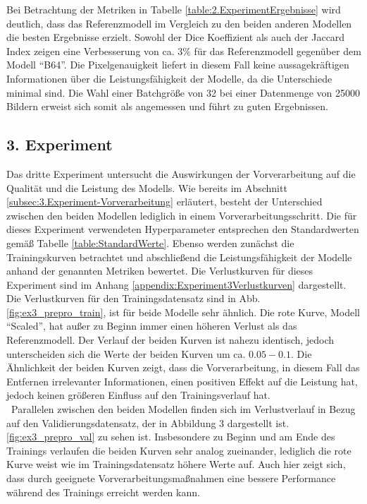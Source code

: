 Bei Betrachtung der Metriken in Tabelle \ref{table:2.ExperimentErgebnisse} wird deutlich, dass das Referenzmodell im Vergleich zu den beiden anderen Modellen die besten Ergebnisse erzielt. Sowohl der Dice Koeffizient als auch der Jaccard Index zeigen eine Verbesserung von ca. $3\%$ für das Referenzmodell gegenüber dem Modell ``B64''. Die Pixelgenauigkeit liefert in diesem Fall keine aussagekräftigen Informationen über die Leistungsfähigkeit der Modelle, da die Unterschiede minimal sind. Die Wahl einer Batchgröße von 32 bei einer Datenmenge von 25000 Bildern erweist sich somit als angemessen und führt zu guten Ergebnissen.

\subsection{3. Experiment}
\label{subsec:3.Experiment}
Das dritte Experiment untersucht die Auswirkungen der Vorverarbeitung auf die Qualität und die Leistung des Modells. Wie bereits im Abschnitt \ref{subsec:3.Experiment-Vorverarbeitung} erläutert, besteht der Unterschied zwischen den beiden Modellen lediglich in einem Vorverarbeitungsschritt. Die für dieses Experiment verwendeten Hyperparameter entsprechen den Standardwerten gemäß Tabelle \ref{table:StandardWerte}. Ebenso werden zunächst die Trainingskurven betrachtet und abschließend die Leistungsfähigkeit der Modelle anhand der genannten Metriken bewertet. Die Verlustkurven für dieses Experiment sind im Anhang \ref{appendix:Experiment3Verlustkurven} dargestellt.\\
Die Verlustkurven für den Trainingsdatensatz sind in Abb. \ref{fig:ex3_prepro_train}, ist für beide Modelle sehr ähnlich. Die rote Kurve, Modell ``Scaled'', hat außer zu Beginn immer einen höheren Verlust als das Referenzmodell. Der Verlauf der beiden Kurven ist nahezu identisch, jedoch unterscheiden sich die Werte der beiden Kurven um ca. $0.05 - 0.1$. Die Ähnlichkeit der beiden Kurven zeigt, dass die Vorverarbeitung, in diesem Fall das Entfernen irrelevanter Informationen, einen positiven Effekt auf die Leistung hat, jedoch keinen größeren Einfluss auf den Trainingsverlauf hat.\\\
Parallelen zwischen den beiden Modellen finden sich im Verlustverlauf in Bezug auf den Validierungsdatensatz, der in Abbildung 3 dargestellt ist. \ref{fig:ex3_prepro_val} zu sehen ist. Insbesondere zu Beginn und am Ende des Trainings verlaufen die beiden Kurven sehr analog zueinander, lediglich die rote Kurve weist wie im Trainingsdatensatz höhere Werte auf. Auch hier zeigt sich, dass durch geeignete Vorverarbeitungsmaßnahmen eine bessere Performance während des Trainings erreicht werden kann.

